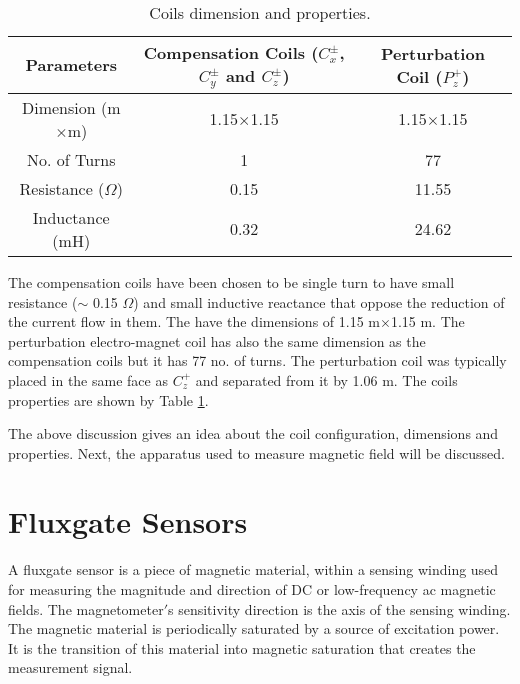 \begin{table} [!htb]
    \centering
    \begin{tabular} { |c|c|c| } 
        \hline
        Parameters & \makecell{Compensation Coils \\ ($C_x^\pm$, $C_y^\pm$ and $C_z^\pm$)} & \makecell{Perturbation Coil \\ ($P_z^+$)} \\
        \hline\hline
        Dimension (m$\times$m) & 1.15$\times$1.15 & 1.15$\times$1.15\\ 
        \hline
        No. of Turns & 1 & 77\\ 
        \hline
        Resistance ($\Omega$) & 0.15 & 11.55\\ 
        \hline
        Inductance (mH) & 0.32 & 24.62\\
         \hline
    \end{tabular}
    \caption{Coils dimension and properties.}\label{table:coil}
\end{table}

The compensation coils have been chosen to be single turn to have small resistance ($\sim$ 0.15 $\Omega$) and small inductive reactance that oppose the reduction of the current flow in them. The have the dimensions of 1.15 m$\times$1.15 m. The perturbation electro-magnet coil has also the same dimension as the compensation coils but it has 77 no. of turns. The perturbation coil was typically placed in the same face as $C_z^+$ and separated from it by 1.06 m. The coils properties are shown by Table \ref{table:coil}. 



The above discussion gives an idea about the coil configuration, dimensions and properties. Next, the apparatus used to measure magnetic field will be discussed.


\section{Fluxgate Sensors}\label{sec:sensor}

A fluxgate sensor is a piece of magnetic material, within a sensing winding used for measuring the magnitude and direction of DC or low-frequency ac magnetic fields. The magnetometer$'$s sensitivity direction is the axis of the sensing winding. The magnetic material is periodically saturated by a source of excitation power. It is the transition of this material into magnetic saturation that creates the measurement signal.

